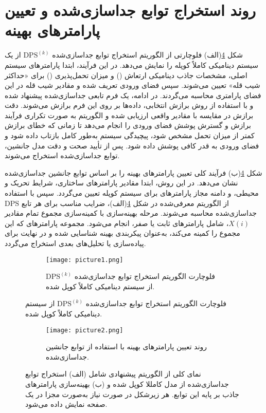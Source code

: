 
\section{روند استخراج توابع جداسازی‌شده و تعیین پارامترهای بهینه}

شکل \ref{fig:DPS-algorithm}(الف) فلوچارتی از الگوریتم استخراج توابع جداسازی‌شده $\mathrm{DPS}^{(k)}$ از یک سیستم دینامیکی کاملاً کوپله را نمایش می‌دهد. در این فرآیند، ابتدا پارامترهای سیستم اصلی، مشخصات جاذب دینامیکی ارتعاش () و میزان تحمل‌پذیری () برای «حداکثر شیب قله» تعیین می‌شوند. سپس فضای ورودی تعریف شده و مقادیر شیب قله در این فضای پارامتری محاسبه می‌گردند. در ادامه، یک فرم تابعی جداسازی‌شده پیشنهاد شده و با استفاده از روش برازش انتخابی، داده‌ها بر روی این فرم برازش می‌شوند. دقت برازش در مقایسه با مقادیر واقعی  ارزیابی شده و الگوریتم به صورت تکراری فرآیند برازش و گسترش پوشش فضای ورودی را انجام می‌دهد تا زمانی که خطای برازش کمتر از میزان تحمل مشخص شود، پیچیدگی سیستم به‌طور کامل بازتاب داده شود و فضای ورودی به قدر کافی پوشش داده شود. پس از تأیید صحت و دقت مدل جانشین، توابع جداسازی‌شده استخراج می‌شوند.

شکل \ref{fig:DPS-algorithm}(ب) فرآیند کلی تعیین پارامترهای بهینه  را بر اساس توابع جانشین جداسازی‌شده نشان می‌دهد. در این روش، ابتدا مقادیر پارامترهای ساختاری، شرایط تحریک و محیطی، و دامنه مجاز پارامترهای  برای سیستم کوپله تعیین می‌گردد. سپس با استفاده از الگوریتم معرفی‌شده در شکل \ref{fig:DPS-algorithm}(الف)، ضرایب مناسب برای هر تابع $\mathrm{DPS}$ جداسازی‌شده محاسبه می‌شوند. مرحله بهینه‌سازی با کمینه‌سازی مجموع تمام مقادیر $X(i)$، شامل پارامترهای ثابت یا صفر، انجام می‌شود. مجموعه پارامترهای  که این مجموع را کمینه می‌کند، به‌عنوان پیکربندی بهینه شناسایی شده و در نهایت برای پیاده‌سازی یا تحلیل‌های بعدی استخراج می‌گردد.

\begin{figure}[H]
    \centering
    \begin{subfigure}[b]{\textwidth}
        \centering
        \texttt{[image: picture1.png]}
        \caption{فلوچارت الگوریتم استخراج توابع جداسازی‌شده $\mathrm{DPS}^{(k)}$ از سیستم دینامیکی کاملاً کوپل شده.}
        \label{fig:dps-subfig1}
    \end{subfigure}
\end{figure}

\begin{figure}[H]
    \centering
    \begin{subfigure}[b]{\textwidth}
        \centering
        \texttt{[image: picture2.png]}
        \caption{روند تعیین پارامترهای بهینه  با استفاده از توابع جانشین جداسازی‌شده.}
        \label{fig:dps-subfig2}
    \end{subfigure}
    \caption{نمای کلی از الگوریتم پیشنهادی شامل (الف) استخراج توابع جداسازی‌شده  از مدل کامللا کوپل شده و (ب) بهینه‌سازی پارامترهای جاذب بر پایه این توابع. هر زیرشکل در صورت نیاز به‌صورت مجزا در یک صفحه نمایش داده می‌شود.}
    \label{fig:DPS-algorithm}
\end{figure}

